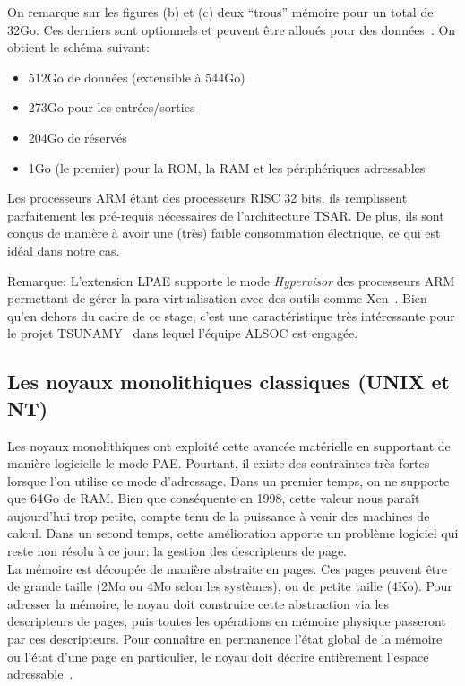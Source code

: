     On remarque sur les figures (b) et (c) deux ``trous'' mémoire pour un total
    de 32Go. Ces derniers sont optionnels et peuvent être alloués pour des
    données~\citep{arm2012principles}. On obtient le schéma suivant:

    \begin{itemize}
      \item 512Go de données (extensible à 544Go)
      \item 273Go pour les entrées/sorties
      \item 204Go de réservés
      \item 1Go (le premier) pour la ROM, la RAM et les périphériques
        adressables
    \end{itemize}

    Les processeurs ARM étant des processeurs RISC 32 bits, ils remplissent
    parfaitement les pré-requis nécessaires de l'architecture TSAR. De plus, ils
    sont conçus de manière à avoir une (très) faible consommation électrique, ce
    qui est idéal dans notre cas.

    \begin{paragraph}{Remarque:}
      L'extension LPAE supporte le mode \textit{Hypervisor} des processeurs ARM
      permettant de gérer la para-virtualisation avec des outils comme
      Xen~\cite{barham2003xen}. Bien qu'en dehors du cadre de ce stage, c'est
      une caractéristique très intéressante pour le projet
      TSUNAMY~\cite{tsunamy2013web} dans lequel l'équipe ALSOC est engagée.
    \end{paragraph}


    \subsection{Les noyaux monolithiques classiques (UNIX et NT)}

      Les noyaux monolithiques ont exploité cette avancée matérielle en
      supportant de manière logicielle le mode PAE. Pourtant, il existe des
      contraintes très fortes lorsque l'on utilise ce mode d'adressage. Dans un
      premier temps, on ne supporte que 64Go de RAM. Bien que conséquente en
      1998, cette valeur nous paraît aujourd'hui trop petite, compte tenu de la
      puissance à venir des machines de calcul.  Dans un second temps, cette
      amélioration apporte un problème logiciel qui reste non résolu à ce jour:
      la gestion des descripteurs de page.\\

      La mémoire est découpée de manière abstraite en pages. Ces pages peuvent
      être de grande taille (2Mo ou 4Mo selon les systèmes), ou de petite taille
      (4Ko). Pour adresser la mémoire, le noyau doit construire cette
      abstraction via les descripteurs de pages, puis toutes les opérations en
      mémoire physique passeront par ces descripteurs. Pour connaître en
      permanence l'état global de la mémoire ou l'état d'une page en
      particulier, le noyau doit décrire entièrement l'espace
      adressable~\citep{cranor1999uvm, gorman2004understanding,
        russinovich2012windows, dillon2000design, steldt2009memory,
        steldtXXXXopenbsd}.

